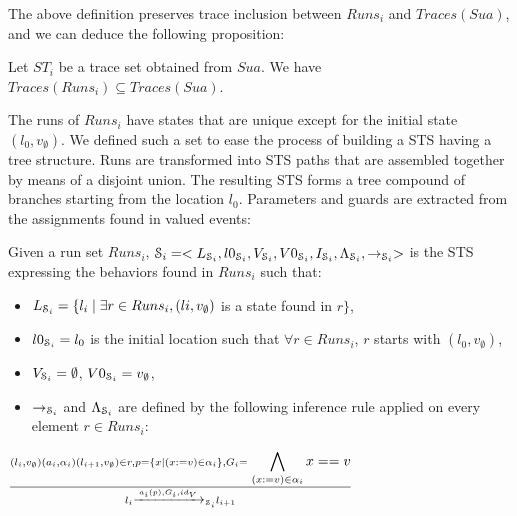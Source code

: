 The above definition preserves trace inclusion between $Runs_i$
and $Traces(Sua)$, and we can deduce the following proposition:

\begin{proposition}
Let $ST_i$ be a trace set obtained from $\mathit{Sua}$. We have
$Traces(Runs_i) \subseteq Traces(Sua)$.
\end{proposition}

The runs of $Runs_i$ have states that are unique except for the
initial state $(l_0,v_\emptyset)$. We defined such a set to
ease the process of building a STS having a tree structure.  Runs
are transformed into STS paths that are assembled together by
means of a disjoint union. The resulting STS forms a tree
compound of branches starting from the location $l_0$. Parameters
and guards are extracted from the assignments found in valued
events:

\begin{definition}
  Given a run set $Runs_i$, $\EuScript{S}_i=<L_{\EuScript{S}_i},
  l0_{\EuScript{S}_i},V_{\EuScript{S}_i}, V0_{\EuScript{S}_i},
  I_{\EuScript{S}_i},\\
  \Lambda_{\EuScript{S}_i},\rightarrow_{\EuScript{S}_i}>$ is the
  STS expressing the behaviors found in $Runs_i$ such that:

	\begin{itemize}
    \item $L_{\EuScript{S}_i}= \{l_i \mid \exists r\in Runs_i,
      (li,v_\emptyset)$ is a state found in $r\}$,

    \item $l0_{\EuScript{S}_i} = l_0$ is the initial location
      such that $\forall r \in Runs_i$, $r$ starts with
      $(l_0,v_\emptyset)$,

    \item $V_{\EuScript{S}_i}=\emptyset$,
      $V0_{\EuScript{S}_i}=v_\emptyset$,

    \item $\rightarrow_{\EuScript{S}_i}$ and
      $\Lambda_{\EuScript{S}_i}$ are defined by the following
      inference rule applied on every element $r\in Runs_i$:
	\end{itemize}

  \begin{center}
    $\frac{(l_i,v_\emptyset) (a_i,\alpha_i) (l_{i+1},v_\emptyset)
    \in r, p=\{x \mid (x:=v)\in \alpha_i \}, G_i=\displaystyle
  \bigwedge_{(x:=v)\in \alpha_i}x==v}{l_i \xrightarrow{a_i(p),G_i,id_V}_{\EuScript{S}_i} l_{i+1}}$
  \end{center}


  \label{IOSTS_tree}
\end{definition}

